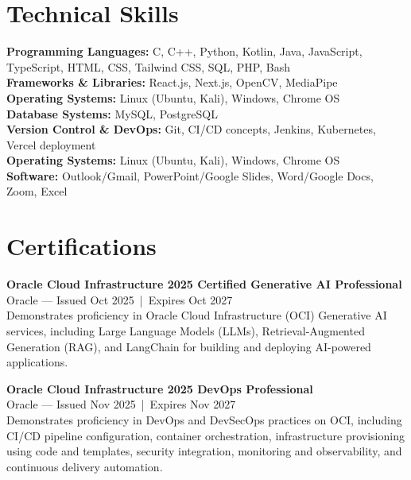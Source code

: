 \documentclass[11pt]{article}
\begin{document}
\section*{Technical Skills}
\textbf{Programming Languages:} C, C++, Python, Kotlin, Java, JavaScript, TypeScript, HTML, CSS, Tailwind CSS, SQL, PHP, Bash \\
\textbf{Frameworks \& Libraries:} React.js, Next.js, OpenCV, MediaPipe \\
\textbf{Operating Systems:} Linux (Ubuntu, Kali), Windows, Chrome OS \\
\textbf{Database Systems:} MySQL, PostgreSQL \\
\textbf{Version Control \& DevOps:} Git, CI/CD concepts, Jenkins, Kubernetes, Vercel deployment \\
\textbf{Operating Systems:} Linux (Ubuntu, Kali), Windows, Chrome OS \\
\textbf{Software:} Outlook/Gmail, PowerPoint/Google Slides, Word/Google Docs, Zoom, Excel

\section*{Certifications}

\textbf{Oracle Cloud Infrastructure 2025 Certified Generative AI Professional} \\
Oracle — Issued Oct 2025 \,|\, Expires Oct 2027 \\
Demonstrates proficiency in Oracle Cloud Infrastructure (OCI) Generative AI services, including Large Language Models (LLMs), Retrieval-Augmented Generation (RAG), and LangChain for building and deploying AI-powered applications.

\vspace{4pt}

\textbf{Oracle Cloud Infrastructure 2025 DevOps Professional} \\
Oracle — Issued Nov 2025 \,|\, Expires Nov 2027 \\
Demonstrates proficiency in DevOps and DevSecOps practices on OCI, including CI/CD pipeline configuration, container orchestration, infrastructure provisioning using code and templates, security integration, monitoring and observability, and continuous delivery automation.

\end{document}

